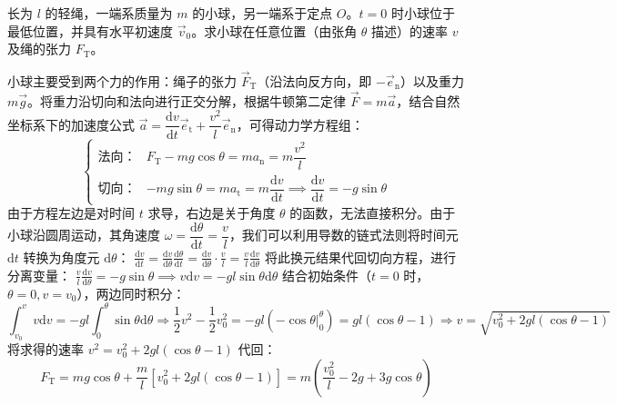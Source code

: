 \documentclass[lang=cn,11pt]{elegantbook}
\begin{document}
\begin{exercise}
长为 $l$ 的轻绳，一端系质量为 $m$ 的小球，另一端系于定点 $O$。$t = 0$ 时小球位于最低位置，并具有水平初速度 $\vec{v}_0$。求小球在任意位置（由张角 $\theta$ 描述）的速率 $v$ 及绳的张力 $F_{\text{T}}$。
\end{exercise}
\begin{solution}
小球主要受到两个力的作用：绳子的张力 $\vec{F}_{\text{T}}$（沿法向反方向，即 $-\vec{e}_{\text{n}}$）以及重力 $m\vec{g}$。将重力沿切向和法向进行正交分解，根据牛顿第二定律 $\vec{F} = m\vec{a}$，结合自然坐标系下的加速度公式 $\vec{a} = \dfrac{\mathrm{d}v}{\mathrm{d}t}\vec{e}_{\text{t}} + \dfrac{v^2}{l}\vec{e}_{\text{n}}$，可得动力学方程组：
$$\begin{cases}
\text{法向：} & F_{\text{T}} - mg\cos\theta = ma_{\text{n}} = m \dfrac{v^2}{l} \\
\text{切向：} & -mg\sin\theta = ma_{\text{t}} = m \dfrac{\mathrm{d}v}{\mathrm{d}t}\implies\dfrac{\mathrm{d}v}{\mathrm{d}t} = -g\sin\theta
\end{cases}$$
由于方程左边是对时间 $t$ 求导，右边是关于角度 $\theta$ 的函数，无法直接积分。由于小球沿圆周运动，其角速度 $\omega = \dfrac{\mathrm{d}\theta}{\mathrm{d}t} = \dfrac{v}{l}$，我们可以利用导数的链式法则将时间元 $\mathrm{d}t$ 转换为角度元 $\mathrm{d}\theta$： \(\frac{\mathrm{d}v}{\mathrm{d}t} = \frac{\mathrm{d}v}{\mathrm{d}\theta} \frac{\mathrm{d}\theta}{\mathrm{d}t} = \frac{\mathrm{d}v}{\mathrm{d}\theta} \cdot \frac{v}{l} = \frac{v}{l}\frac{\mathrm{d}v}{\mathrm{d}\theta}\) 
将此换元结果代回切向方程，进行分离变量：
 \(\frac{v}{l}\frac{\mathrm{d}v}{\mathrm{d}\theta} = -g\sin\theta \implies v\mathrm{d}v = -gl\sin\theta\mathrm{d}\theta\) 结合初始条件（$t=0$ 时，$\theta = 0, v = v_0$），两边同时积分：$$\int_{v_0}^{v} v\mathrm{d}v = -gl\int_{0}^{\theta} \sin\theta\mathrm{d}\theta\Rightarrow\frac{1}{2}v^2 - \frac{1}{2}v_0^2 = -gl \left( -\cos\theta \Big|_0^\theta \right) = gl(\cos\theta - 1)\Rightarrow v = \sqrt{v_0^2 + 2gl(\cos\theta - 1)}$$
将求得的速率 $v^2 = v_0^2 + 2gl(\cos\theta - 1)$ 代回：$$F_{\text{T}} = mg\cos\theta + \frac{m}{l}\left[ v_0^2 + 2gl(\cos\theta - 1) \right]= m\left( \frac{v_0^2}{l} - 2g + 3g\cos\theta \right)$$
\end{solution}
\end{document}
